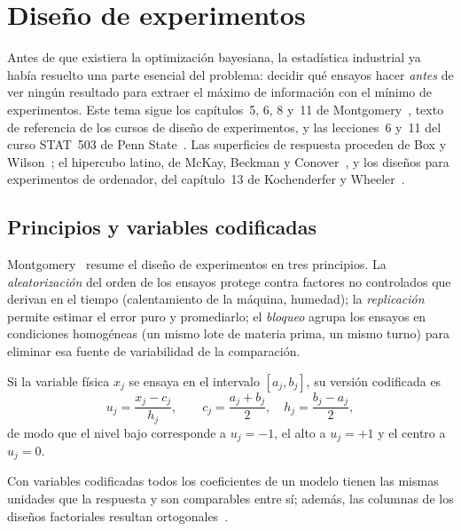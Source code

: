 \chapter{Diseño de experimentos}
\label{tema:2}

Antes de que existiera la optimización bayesiana, la estadística industrial ya había resuelto una parte esencial del problema: decidir qué ensayos hacer \emph{antes} de ver ningún resultado para extraer el máximo de información con el mínimo de experimentos. Este tema sigue los capítulos~5, 6, 8 y~11 de Montgomery~\cite{montgomery}, texto de referencia de los cursos de diseño de experimentos, y las lecciones~6 y~11 del curso STAT~503 de Penn State~\cite{psu503}. Las superficies de respuesta proceden de Box y Wilson~\cite{boxwilson}; el hipercubo latino, de McKay, Beckman y Conover~\cite{mckay}, y los diseños para experimentos de ordenador, del capítulo~13 de Kochenderfer y Wheeler~\cite{kw}.

\section{Principios y variables codificadas}

Montgomery~\cite[§1.4]{montgomery} resume el diseño de experimentos en tres principios. La \emph{aleatorización} del orden de los ensayos protege contra factores no controlados que derivan en el tiempo (calentamiento de la máquina, humedad); la \emph{replicación} permite estimar el error puro y promediarlo; el \emph{bloqueo} agrupa los ensayos en condiciones homogéneas (un mismo lote de materia prima, un mismo turno) para eliminar esa fuente de variabilidad de la comparación.

\begin{definicion}\label{def:codificadas}
Si la variable física $x_j$ se ensaya en el intervalo $[a_j,b_j]$, su versión codificada es
\[
u_j=\frac{x_j-c_j}{h_j},\qquad c_j=\frac{a_j+b_j}{2},\quad h_j=\frac{b_j-a_j}{2},
\]
de modo que el nivel bajo corresponde a $u_j=-1$, el alto a $u_j=+1$ y el centro a $u_j=0$.
\end{definicion}

Con variables codificadas todos los coeficientes de un modelo tienen las mismas unidades que la respuesta y son comparables entre sí; además, las columnas de los diseños factoriales resultan ortogonales~\cite[§6.9]{montgomery}.

